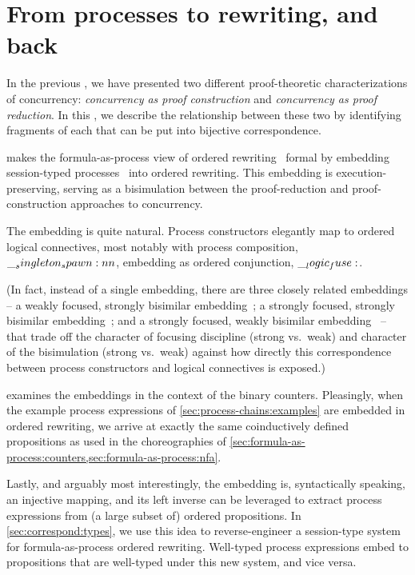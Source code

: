 \chapter{From processes to rewriting, and back}\label{ch:correspond}

In the previous , we have presented two different proof-theoretic characterizations of concurrency: \emph{concurrency as proof construction} and \emph{concurrency as proof reduction}.
In this , we describe the relationship between these two by identifying fragments of each that can be put into bijective correspondence.

 makes the formula-as-process view of ordered rewriting~ formal by embedding session-typed processes~ into ordered rewriting.
This embedding is execution-preserving, serving as a bisimulation between the proof-reduction and proof-construction approaches to concurrency.

The embedding is quite natural.
Process constructors elegantly map to ordered logical connectives, most notably with process composition, $\__singleton_spawn:nn {} {}$, embedding as ordered conjunction, $\__logic_fuse:$.

(In fact, instead of a single embedding, there are three closely related embeddings -- a weakly focused, strongly bisimilar embedding~; a strongly focused, strongly bisimilar embedding~; and a strongly focused, weakly bisimilar embedding~ -- that trade off the character of focusing discipline (strong vs.\ weak) and character of the bisimulation (strong vs.\ weak) against how directly this correspondence between process constructors and logical connectives is exposed.)

 examines the embeddings in the context of the binary counters.
Pleasingly, when the example process expressions of \cref{sec:process-chains:examples} are embedded in ordered rewriting, we arrive at exactly the same coinductively defined propositions as used in the choreographies of \cref{sec:formula-as-process:counters,sec:formula-as-process:nfa}.

Lastly, and arguably most interestingly, the embedding is, syntactically speaking, an injective mapping, and its left inverse can be leveraged to extract process expressions from (a large subset of) ordered propositions.
In \cref{sec:correspond:types}, we use this idea to reverse-engineer a session-type system for formula-as-process ordered rewriting.
Well-typed process expressions embed to propositions that are well-typed under this new system, and vice versa.

